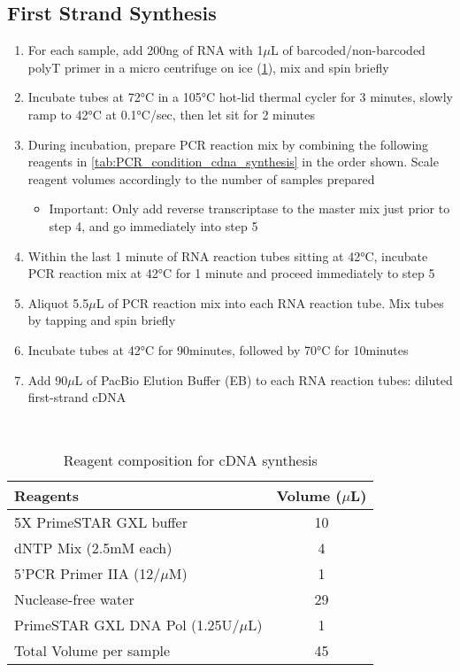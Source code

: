 \subsection{First Strand Synthesis}
\label{Isoseq_protocol_cDNAsynthesis}
\begin{enumerate}
	\item For each sample, add 200ng of RNA with 1$\mu$L of barcoded/non-barcoded polyT primer in a micro centrifuge on ice (\cref{tab:cdna_synthesis}), mix and spin briefly
	\item Incubate tubes at 72°C in a 105°C hot-lid thermal cycler for 3 minutes, slowly ramp to 42°C at 0.1°C/sec, then let sit for 2 minutes
	\item During incubation, prepare PCR reaction mix by combining the following reagents in \cref{tab:PCR_condition_cdna_synthesis} in the order shown. Scale reagent volumes accordingly to the number of samples prepared
	\begin{itemize}
		\item Important:  Only add reverse transcriptase to the master mix just prior to step 4, and go immediately into step 5 
	\end{itemize}
	\item Within the last 1 minute of RNA reaction tubes sitting at 42°C, incubate PCR reaction mix at 42°C for 1 minute and proceed immediately to step 5
	\item Aliquot 5.5$\mu$L of PCR reaction mix into each RNA reaction tube. Mix tubes by tapping and spin briefly 
	\item Incubate tubes at 42°C for 90minutes, followed by 70°C for 10minutes 
	\item Add 90$\mu$L of PacBio Elution Buffer (EB) to each RNA reaction tubes: diluted first-strand cDNA
\end{enumerate}

\
\begin{table}[h]
	\centering
	\begin{tabularx}{0.8\textwidth}{lc}
		\toprule 
		Reagents                         & Volume ($\mu$L) \\ \midrule
		5X PrimeSTAR GXL buffer          & 10          \\ 
		dNTP Mix (2.5mM each)            & 4           \\ 
		5'PCR Primer IIA (12/$\mu$M)     & 1           \\ 
		Nuclease-free water              & 29          \\ 
		PrimeSTAR GXL DNA Pol (1.25U/$\mu$L) & 1       \\ 
		Total Volume per sample          & 45          \\ 
		\bottomrule	
	\end{tabularx}
	\caption[Reagent composition for cDNA synthesis]%
	{Reagent composition for cDNA synthesis}
	\label{tab:cdna_synthesis}
\end{table}

